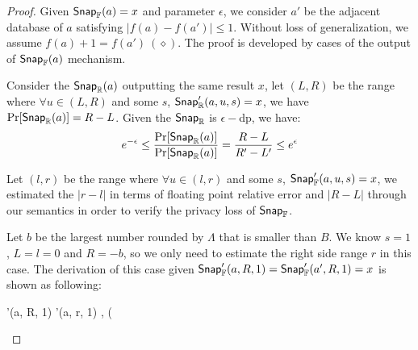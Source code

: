 \documentclass[a4paper,11pt]{article}
\begin{document}
\begin{proof}

Given $\mathsf{Snap}_{\mathbb{F}}(a) = x$ and parameter $\epsilon$, we consider $a'$ be the adjacent database of $a$ satisfying $|f(a) - f(a')| \leq 1$.
Without loss of generalization, we assume $f(a) + 1 = f(a') ~ (\diamond)$.
The proof is developed by cases of the output of $\mathsf{Snap}_{\mathbb{F}}(a)$ mechanism.
%

%
Consider the $\mathsf{Snap}_{\mathbb{R}}(a)$ outputting the same result $x$, let $(L, R)$ be the range where $\forall u \in (L, R)$ and some $s$, $\mathsf{Snap}_{\mathbb{R}}'(a, u, s) = x$, we have $\Pr[\mathsf{Snap}_{\mathbb{R}}(a)] = R - L$. Given the $\mathsf{Snap}_{\mathbb{R}}$ is $\epsilon-$dp, we have:
\[
	e^{-\epsilon} \leq \frac{\Pr[\mathsf{Snap}_{\mathbb{R}}(a)]}{\Pr[\mathsf{Snap}_{\mathbb{R}}(a)]} = \frac{R - L}{R' - L'} \leq e^{\epsilon}
\]
%

%
Let $(l, r)$ be the range where $\forall u \in (l, r)$ and some $s$, $\mathsf{Snap}_{\mathbb{F}}'(a, u, s) = x$, we estimated the $|r - l|$ in terms of floating point relative error and $|R - L|$ through our semantics in order to verify the privacy loss of $\mathsf{Snap}_{\mathbb{F}}$.
	\begin{itemize}
		Let $b$ be the largest number rounded by $\Lambda$ that is smaller than $B$.
		We know $s = 1$, $L = l = 0$ and $R = -b$, so we only need to estimate the right side range $r$ in this case. The derivation of this case given $\mathsf{Snap}_{\mathbb{F}}'(a, R, 1) = \mathsf{Snap}_{\mathbb{F}}'(a', R, 1) = x$ is shown as following:
		\begin{mathpar}
		{
			{
				{
					{
						\rsnap'(a, R, 1)
						\bigstep
						\fsnap'(a, r, 1)
						,
						(
}}}}
\end{mathpar}
\end{itemize}
\end{proof}
\end{document}
